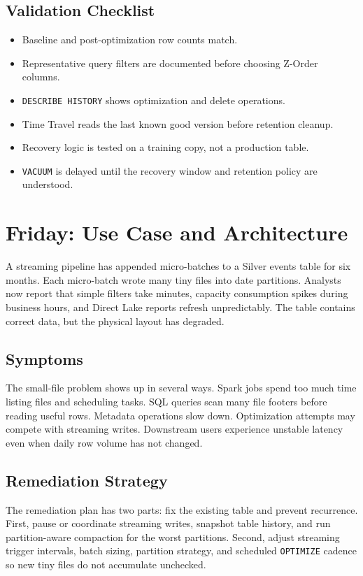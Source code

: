 \subsection{Validation Checklist}
\begin{itemize}
    \item Baseline and post-optimization row counts match.
    \item Representative query filters are documented before choosing Z-Order columns.
    \item \texttt{DESCRIBE HISTORY} shows optimization and delete operations.
    \item Time Travel reads the last known good version before retention cleanup.
    \item Recovery logic is tested on a training copy, not a production table.
    \item \texttt{VACUUM} is delayed until the recovery window and retention policy are understood.
\end{itemize}

\section{Friday: Use Case and Architecture}
A streaming pipeline has appended micro-batches to a Silver events table for six months. Each micro-batch wrote many tiny files into date partitions. Analysts now report that simple filters take minutes, capacity consumption spikes during business hours, and Direct Lake reports refresh unpredictably. The table contains correct data, but the physical layout has degraded.

\subsection{Symptoms}
The small-file problem shows up in several ways. Spark jobs spend too much time listing files and scheduling tasks. SQL queries scan many file footers before reading useful rows. Metadata operations slow down. Optimization attempts may compete with streaming writes. Downstream users experience unstable latency even when daily row volume has not changed.

\subsection{Remediation Strategy}
The remediation plan has two parts: fix the existing table and prevent recurrence. First, pause or coordinate streaming writes, snapshot table history, and run partition-aware compaction for the worst partitions. Second, adjust streaming trigger intervals, batch sizing, partition strategy, and scheduled \texttt{OPTIMIZE} cadence so new tiny files do not accumulate unchecked.

